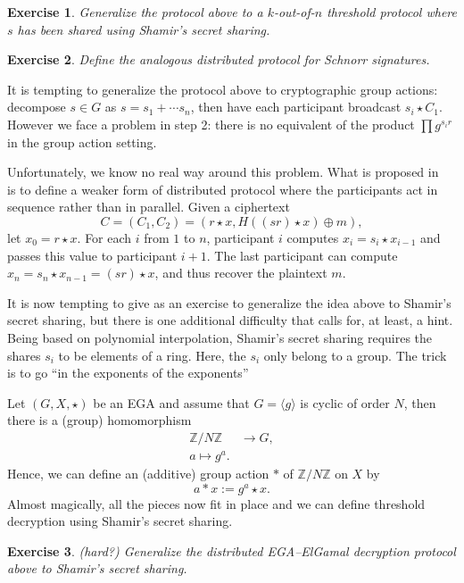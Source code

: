 \documentclass{article}
\newtheorem{ex}{Exercise}
\def\Z{\mathbb{Z}}
\begin{document}
\begin{ex}
  Generalize the protocol above to a $k$-out-of-$n$ threshold protocol
  where $s$ has been shared using Shamir's secret sharing.
\end{ex}

\begin{ex}
  Define the analogous distributed protocol for Schnorr signatures.
\end{ex}

It is tempting to generalize the protocol above to cryptographic group
actions: decompose $s\in G$ as $s = s_1 + \cdots s_n$, then have each
participant broadcast $s_i\star C_1$.  However we face a problem in
step 2: there is no equivalent of the product $\prod g^{s_i r}$ in the
group action setting.

Unfortunately, we know no real way around this problem.  What is
proposed in~\cite{PKC:DeFMey20} is to define a weaker form of
distributed protocol where the participants act in sequence rather
than in parallel. Given a ciphertext
\[C = (C_1, C_2) = (r\star x, H((sr)\star x) \oplus m),\] let
$x_0=r\star x$.  For each $i$ from $1$ to $n$, participant $i$
computes $x_i = s_i\star x_{i-1}$ and passes this value to participant
$i+1$.  The last participant can compute
$x_n = s_n\star x_{n-1} = (sr)\star x$, and thus recover the plaintext
$m$.

It is now tempting to give as an exercise to generalize the idea above
to Shamir's secret sharing, but there is one additional difficulty
that calls for, at least, a hint.  Being based on polynomial
interpolation, Shamir's secret sharing requires the shares $s_i$ to be
elements of a ring.  Here, the $s_i$ only belong to a group.  The
trick is to go ``in the exponents of the exponents''

Let $(G,X,\star)$ be an EGA and assume that $G=\langle g\rangle$ is
cyclic of order $N$, then there is a (group) homomorphism
\[
  \begin{aligned}
    \Z/N\Z &\to G,\\
    a \mapsto g^a.
  \end{aligned}
\]
Hence, we can define an (additive) group action $*$ of $\Z/N\Z$ on $X$
by
\[a * x := g^a \star x.\] Almost magically, all the pieces now fit in
place and we can define threshold decryption using Shamir's secret
sharing.

\begin{ex}(hard?)
  Generalize the distributed EGA--ElGamal decryption protocol above to
  Shamir's secret sharing.
\end{ex}
\end{document}

